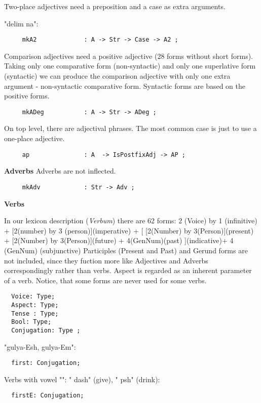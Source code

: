 Two-place adjectives need a preposition and a case as extra arguments.

"{\cyr delim na}":
\begin{verbatim}
     mkA2             : A -> Str -> Case -> A2 ;
\end{verbatim}

Comparison adjectives need a positive adjective (28 forms without
short forms). Taking only one comparative form (non-syntactic) and
only one superlative form (syntactic) we can produce the
comparison adjective with only one extra argument - non-syntactic
comparative form. Syntactic forms are based on the positive forms.

\begin{verbatim}
     mkADeg           : A -> Str -> ADeg ;
\end{verbatim}
On top level, there are adjectival phrases. The most common case
is just to use a one-place adjective.
\begin{verbatim}
     ap               : A  -> IsPostfixAdj -> AP ;
\end{verbatim}

\textbf{Adverbs}
Adverbs are not inflected. %
\begin{verbatim}
     mkAdv            : Str -> Adv ;
\end{verbatim}

\textbf{Verbs}

In our lexicon description ({\it Verbum}) there are 62 forms: 2
(Voice) by { 1 (infinitive) + [2(number) by 3
(person)](imperative) + [ [2(Number) by 3(Person)](present) +
[2(Number) by 3(Person)](future) + 4(GenNum)(past) ](indicative)+
4 (GenNum) (subjunctive) } Participles (Present and Past) and
Gerund forms are not included, since they fuction more like
Adjectives and Adverbs correspondingly rather than verbs. Aspect
is regarded as an inherent parameter of a verb. Notice, that some
forms are never used for some verbs. %
\begin{verbatim}
  Voice: Type;
  Aspect: Type;
  Tense : Type;
  Bool: Type;
  Conjugation: Type ;
\end{verbatim}
"{\cyr gulya-Esh\cyrsftsn{}, gulya-Em}":
\begin{verbatim}
  first: Conjugation;
\end{verbatim}

\noindent Verbs with vowel "{\cyr \cyryo}": "{\cyr
da\cyryo{}sh\cyrsftsn{}}" (give), "{\cyr
p\cyrsftsn{}\cyryo{}sh\cyrsftsn{}}" (drink):
\begin{verbatim}
  firstE: Conjugation;
\end{verbatim}

